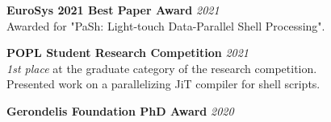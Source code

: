 \documentclass[margin]{res}
\begin{document}
\begin{resume}
\textbf{EuroSys 2021 Best Paper Award} \hfill {\em 2021} \\
Awarded for "PaSh: Light-touch Data-Parallel Shell Processing".

\textbf{POPL Student Research Competition} \hfill {\em 2021} \\
\textit{1st place} at the graduate category of the research competition. \\
Presented work on a parallelizing JiT compiler for shell scripts. 

\textbf{Gerondelis Foundation PhD Award} \hfill {\em 2020}









\end{resume}
\end{document}
